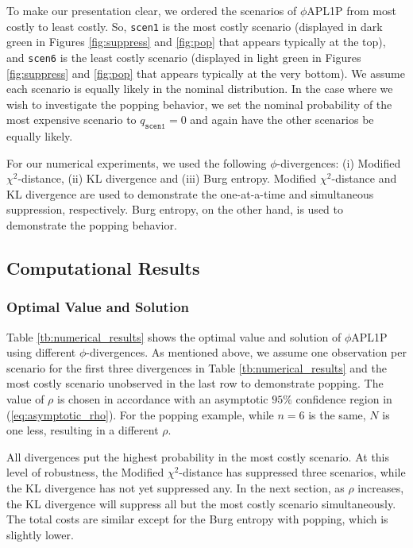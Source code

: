 \documentclass[opre,nonblindrev]{informs3} %
\begin{document}
To make our presentation clear, we ordered the scenarios of $\phi$APL1P from most costly to least costly. 
So, \texttt{scen1} is the most costly scenario  (displayed in dark green in Figures \ref{fig:suppress} and \ref{fig:pop} that appears typically at the top), and  \texttt{scen6} is the least costly scenario (displayed in light green in Figures \ref{fig:suppress} and \ref{fig:pop} that appears typically at the very bottom). 
We assume each scenario is equally likely in the nominal distribution. 
In the case where we wish to investigate the popping behavior, we set the nominal probability of the most expensive scenario to $q_{\texttt{scen1}} = 0$ and again have the other scenarios be equally likely.  


For our numerical experiments, we used the following $\phi$-divergences: (i) Modified $\chi^2$-distance, (ii) KL divergence and (iii) Burg entropy.  
Modified $\chi^2$-distance and KL divergence are used to demonstrate the one-at-a-time and simultaneous suppression, respectively. 
Burg entropy, on the other hand, is used to demonstrate the popping behavior. 


\subsection{Computational Results}
\label{ssec:numerical_results}


\subsubsection{Optimal Value and Solution}
\label{ssec:opt}

Table \ref{tb:numerical_results} shows the optimal value and solution of $\phi$APL1P using different $\phi$-divergences.  
As mentioned above, we assume one observation per scenario for the first three divergences in Table \ref{tb:numerical_results} and the most costly scenario unobserved in the last row to demonstrate popping.
The value of $\rho$ is chosen in accordance with an asymptotic $95\%$ confidence region in (\ref{eq:asymptotic_rho}).
For the popping example, while $n=6$ is the same, $N$ is one less, resulting in a different $\rho$. 

All divergences put the highest probability in the most costly scenario. 
At this level of robustness, the Modified $\chi^2$-distance has suppressed three scenarios, while the KL divergence has not yet suppressed any.
In the next section, as $\rho$ increases, the KL divergence will suppress all but the most costly scenario simultaneously. 
The total costs are similar except for the Burg entropy with popping, which is slightly lower.
\end{document}
